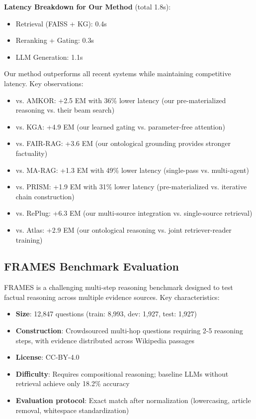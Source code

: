 \documentclass[10pt,twocolumn]{article}
\begin{document}
\textbf{Latency Breakdown for Our Method} (total 1.8s):
\begin{itemize}
    \item Retrieval (FAISS + KG): 0.4s
    \item Reranking + Gating: 0.3s
    \item LLM Generation: 1.1s
\end{itemize}

Our method outperforms all recent systems while maintaining competitive latency. Key observations:
\begin{itemize}
    \item vs. AMKOR: +2.5 EM with 36\% lower latency (our pre-materialized reasoning vs. their beam search)
    \item vs. KGA: +4.9 EM (our learned gating vs. parameter-free attention)
    \item vs. FAIR-RAG: +3.6 EM (our ontological grounding provides stronger factuality)
    \item vs. MA-RAG: +1.3 EM with 49\% lower latency (single-pass vs. multi-agent)
    \item vs. PRISM: +1.9 EM with 31\% lower latency (pre-materialized vs. iterative chain construction)
    \item vs. RePlug: +6.3 EM (our multi-source integration vs. single-source retrieval)
    \item vs. Atlas: +2.9 EM (our ontological reasoning vs. joint retriever-reader training)
\end{itemize}



\subsection{FRAMES Benchmark Evaluation}
\label{sec:frames}

FRAMES \cite{krishna2024frames} is a challenging multi-step reasoning benchmark designed to test factual reasoning across multiple evidence sources. Key characteristics:

\begin{itemize}
    \item \textbf{Size}: 12,847 questions (train: 8,993, dev: 1,927, test: 1,927)
    \item \textbf{Construction}: Crowdsourced multi-hop questions requiring 2-5 reasoning steps, with evidence distributed across Wikipedia passages
    \item \textbf{License}: CC-BY-4.0
    \item \textbf{Difficulty}: Requires compositional reasoning; baseline LLMs without retrieval achieve only 18.2\% accuracy
    \item \textbf{Evaluation protocol}: Exact match after normalization (lowercasing, article removal, whitespace standardization)
\end{itemize}
\end{document}
